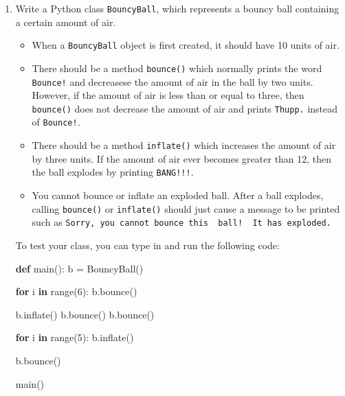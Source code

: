 \documentclass[]{article}
\newenvironment{Shaded}{}{}
\newcommand{\BuiltInTok}[1]{#1}
\newcommand{\ControlFlowTok}[1]{\textcolor[rgb]{0.00,0.44,0.13}{\textbf{#1}}}
\newcommand{\DecValTok}[1]{\textcolor[rgb]{0.25,0.63,0.44}{#1}}
\newcommand{\KeywordTok}[1]{\textcolor[rgb]{0.00,0.44,0.13}{\textbf{#1}}}
\newcommand{\NormalTok}[1]{#1}
\newcommand{\OperatorTok}[1]{\textcolor[rgb]{0.40,0.40,0.40}{#1}}
\providecommand{\tightlist}{%
  \setlength{\itemsep}{0pt}\setlength{\parskip}{0pt}}
\begin{document}
\begin{enumerate}
\def\labelenumi{\arabic{enumi}.}
\item
  Write a Python class \texttt{BouncyBall}, which represents a bouncy
  ball containing a certain amount of air.

  \begin{itemize}
  \tightlist
  \item
    When a \texttt{BouncyBall} object is first created, it should have
    10 units of air.
  \item
    There should be a method \texttt{bounce()} which normally prints the
    word \texttt{Bounce!} and decreasese the amount of air in the ball
    by two units. However, if the amount of air is less than or equal to
    three, then \texttt{bounce()} does not decrease the amount of air
    and prints \texttt{Thupp.} instead of \texttt{Bounce!}.
  \item
    There should be a method \texttt{inflate()} which increases the
    amount of air by three units. If the amount of air ever becomes
    greater than 12, then the ball explodes by printing
    \texttt{BANG!!!}.
  \item
    You cannot bounce or inflate an exploded ball. After a ball
    explodes, calling \texttt{bounce()} or \texttt{inflate()} should
    just cause a message to be printed such as
    \texttt{Sorry,\ you\ cannot\ bounce\ this\ \ ball!\ \ It\ has\ exploded.}
  \end{itemize}

  To test your class, you can type in and run the following code:

\begin{Shaded}
\begin{Highlighting}[]
\KeywordTok{def}\NormalTok{ main():}
\NormalTok{    b }\OperatorTok{=}\NormalTok{ BouncyBall()}

    \ControlFlowTok{for}\NormalTok{ i }\KeywordTok{in} \BuiltInTok{range}\NormalTok{(}\DecValTok{6}\NormalTok{):}
\NormalTok{        b.bounce()}

\NormalTok{    b.inflate()}
\NormalTok{    b.bounce()}
\NormalTok{    b.bounce()}

    \ControlFlowTok{for}\NormalTok{ i }\KeywordTok{in} \BuiltInTok{range}\NormalTok{(}\DecValTok{5}\NormalTok{):}
\NormalTok{        b.inflate()}

\NormalTok{    b.bounce()}

\NormalTok{main()}
\end{Highlighting}
\end{Shaded}


\end{enumerate}
\end{document}
